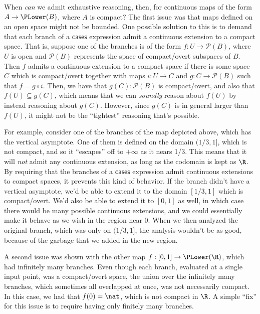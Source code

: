When \emph{can} we admit exhaustive reasoning, then, for continuous maps of the form $A \to \PLower(B)$, where $A$ is compact? The first issue was that maps defined on an open space might not be bounded. One possible solution to this is to demand that each branch of a $\mathsf{cases}$ expression admit a continuous extension to a compact space. That is, suppose one of the branches is of the form $f : U \to \mathcal{P}(B)$, where $U$ is open and $\mathcal{P}(B)$ represents the space of compact/overt subspaces of $B$. Then $f$ admits a continuous extension to a compact space if there is some space $C$ which is compact/overt together with maps $i : U \to C$ and $g : C \to \mathcal{P}(B)$ such that $f = g \circ i$. Then, we have that $g(C) : \mathcal{P}(B)$ is compact/overt, and also that $f(U) \subseteq g(C)$, which means that we can \emph{soundly} reason about $f(U)$ by instead reasoning about $g(C)$. However, since $g(C)$ is in general larger than $f(U)$, it might not be the ``tightest'' reasoning that's possible.

For example, consider one of the branches of the map depicted above, which has the vertical asymptote. One of them is defined on the domain $(1/3, 1]$, which is not compact, and so it ``escapes'' off to $+\infty$ as it nears 1/3. This means that it will \emph{not} admit any continuous extension, as long as the codomain is kept as $\R$. By requiring that the branches of a $\mathsf{cases}$ expression admit continuous extensions to compact spaces, it prevents this kind of behavior. If the branch didn't have a vertical asymptote, we'd be able to extend it to the domain $[1/3, 1]$ which is compact/overt. We'd also be able to extend it to $[0,1]$ as well, in which case there would be many possible continuous extensions, and we could essentially make it behave as we wish in the region near 0. When we then analyzed the original branch, which was only on $(1/3, 1]$, the analysis wouldn't be as good, because of the garbage that we added in the new region.

A second issue was shown with the other map $f : [0,1] \to \PLower(\R)$, which had infinitely many branches. Even though each branch, evaluated at a single input point, was a compact/overt space, the union over the infinitely many branches, which sometimes all overlapped at once, was not necessarily compact. In this case, we had that $f(0) = \nat$, which is not compact in $\R$. A simple ``fix'' for this issue is to require having only finitely many branches.

